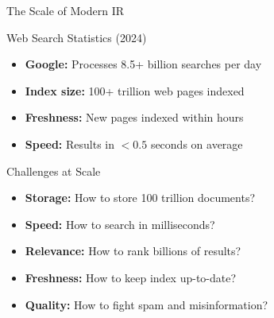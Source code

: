 \documentclass[aspectratio=169]{beamer}
\newif\ifanimated
\newcommand{\cpause}{\ifanimated\pause\fi}
\begin{document}
\begin{frame}[shrink=5]{The Scale of Modern IR}
\begin{block}{Web Search Statistics (2024)}
\begin{itemize}
    \item \textbf{Google:} Processes 8.5+ billion searches per day
    \item \textbf{Index size:} 100+ trillion web pages indexed
    \item \textbf{Freshness:} New pages indexed within hours
    \item \textbf{Speed:} Results in $< 0.5$ seconds on average
\end{itemize}
\cpause
\end{block}
\vspace{1em}

\begin{exampleblock}{Challenges at Scale}
\begin{itemize}
    \item \textbf{Storage:} How to store 100 trillion documents?
    \item \textbf{Speed:} How to search in milliseconds?
    \item \textbf{Relevance:} How to rank billions of results?
    \item \textbf{Freshness:} How to keep index up-to-date?
    \item \textbf{Quality:} How to fight spam and misinformation?
\end{itemize}
\end{exampleblock}
\end{frame}
\end{document}
